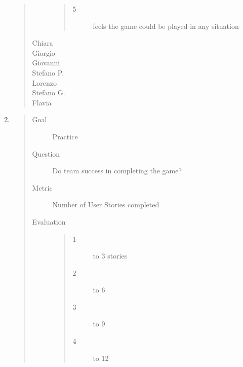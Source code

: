\documentclass[letterpaper,10pt,italian]{sphinxmanual}
\begin{document}
\begin{enumerate}
\begin{quote}
\begin{description}
\begin{quote}
\begin{description}
\item[{5}] \leavevmode
\sphinxAtStartPar
feels the game could be played in any situation

\end{description}\end{quote}

\item[{Chiara}] \leavevmode
{}

\item[{Giorgio}] \leavevmode
{}

\item[{Giovanni}] \leavevmode
{}

\item[{Stefano P.}] \leavevmode
{}

\item[{Lorenzo}] \leavevmode
{}

\item[{Stefano G.}] \leavevmode
{}

\item[{Flavia}] \leavevmode
{}

\end{description}\end{quote}

\item {} \begin{quote}\begin{description}
\item[{Goal}] \leavevmode
\sphinxAtStartPar
Practice

\item[{Question}] \leavevmode
\sphinxAtStartPar
Do team success in completing the game?

\item[{Metric}] \leavevmode
\sphinxAtStartPar
Number of User Stories completed

\item[{Evaluation}] \leavevmode\begin{quote}\begin{description}
\item[{1}] \leavevmode
{} to 3 stories

\item[{2}] \leavevmode
{} to 6

\item[{3}] \leavevmode
{} to 9

\item[{4}] \leavevmode
{} to 12


\end{description}
\end{quote}
\end{description}
\end{quote}
\end{enumerate}
\end{document}
